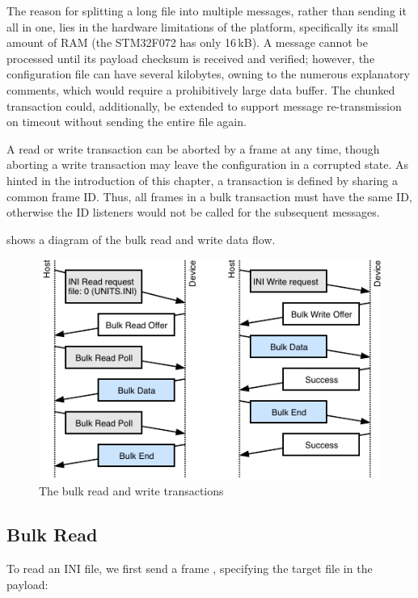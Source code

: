 The reason for splitting a long file into multiple messages, rather than sending it all in one, lies in the hardware limitations of the platform, specifically its small amount of \gls{RAM} (the STM32F072 has only 16\,kB). A message cannot be processed until its payload checksum is received and verified; however, the configuration file can have several kilobytes, owning to the numerous explanatory comments, which would require a prohibitively large data buffer. The chunked transaction could, additionally, be extended to support message re-transmission on timeout without sending the entire file again.

A read or write transaction can be aborted by a frame \CmdBulkAbort at any time, though aborting a write transaction may leave the configuration in a corrupted state. As hinted in the introduction of this chapter, a transaction is defined by sharing a common frame ID. Thus, all frames in a bulk transaction must have the same ID, otherwise the ID listeners would not be called for the subsequent messages.

 shows a diagram of the bulk read and write data flow.

\begin{figure}
	\centering
	\includegraphics[scale=1.5]{img/bulk-read-write.pdf}
	\caption{\label{fig:bulk_rw}The bulk read and write transactions}
\end{figure}

\subsection{Bulk Read}

To read an INI file, we first send a frame \CmdINIRead, specifying the target file in the payload:

